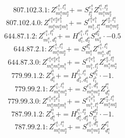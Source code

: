 \documentclass[letterpaper,10pt,fleqn,leqno,onecolumn]{article}
\begin{document}
\begin{equation} \;\;\;\;\;\;  807.102.3.1: Z^{e_{1}^{a},l_{1}^{a}}_{m_{1}^{a}m_{2}^{a}}+=S^{e_{1}^{a}}_{l_{2}^{a}}Z^{l_{1}^{a},l_{2}^{a}}_{m_{1}^{a}m_{2}^{a}} \end{equation}
\begin{equation} \;\;\;\;\;\;  807.102.4.0: Z^{e_{1}^{a}e_{2}^{a}e_{1}^{b}}_{m_{1}^{a}m_{2}^{a}m_{1}^{b}}+=S^{e_{1}^{a}e_{1}^{b}}_{m_{1}^{b},l_{1}^{a}}Z^{e_{2}^{a},l_{1}^{a}}_{m_{1}^{a}m_{2}^{a}} \end{equation}
\begin{equation} \;\;\;\;\;\;  644.87.1.2: Z^{e_{1}^{a},l_{1}^{a}}_{m_{1}^{a},d_{1}^{a}}+=H^{e_{1}^{a},l_{1}^{a}}_{d_{1}^{a},d_{2}^{a}}S^{d_{2}^{a}}_{m_{1}^{a}}\cdot -0.5 \end{equation}
\begin{equation} \;\;\;\;\;\;  644.87.2.1: Z^{e_{1}^{a},l_{1}^{a}}_{m_{1}^{a}m_{2}^{a}}+=S^{d_{1}^{a}}_{m_{1}^{a}}Z^{e_{1}^{a},l_{1}^{a}}_{m_{2}^{a},d_{1}^{a}} \end{equation}
\begin{equation} \;\;\;\;\;\;  644.87.3.0: Z^{e_{1}^{a}e_{2}^{a}e_{1}^{b}}_{m_{1}^{a}m_{2}^{a}m_{1}^{b}}+=S^{e_{1}^{a}e_{1}^{b}}_{m_{1}^{b},l_{1}^{a}}Z^{e_{2}^{a},l_{1}^{a}}_{m_{1}^{a}m_{2}^{a}} \end{equation}
\begin{equation} \;\;\;\;\;\;  779.99.1.2: Z^{l_{1}^{a}}_{d_{1}^{a}}+=H^{l_{1}^{b},l_{1}^{a}}_{d_{1}^{b},d_{1}^{a}}S^{d_{1}^{b}}_{l_{1}^{b}}\cdot -1. \end{equation}
\begin{equation} \;\;\;\;\;\;  779.99.2.1: Z^{e_{1}^{a},l_{1}^{a}}_{m_{1}^{a}m_{2}^{a}}+=S^{e_{1}^{a},d_{1}^{a}}_{m_{1}^{a}m_{2}^{a}}Z^{l_{1}^{a}}_{d_{1}^{a}} \end{equation}
\begin{equation} \;\;\;\;\;\;  779.99.3.0: Z^{e_{1}^{a}e_{2}^{a}e_{1}^{b}}_{m_{1}^{a}m_{2}^{a}m_{1}^{b}}+=S^{e_{1}^{a}e_{1}^{b}}_{m_{1}^{b},l_{1}^{a}}Z^{e_{2}^{a},l_{1}^{a}}_{m_{1}^{a}m_{2}^{a}} \end{equation}
\begin{equation} \;\;\;\;\;\;  787.99.1.2: Z^{l_{1}^{a}}_{d_{1}^{a}}+=H^{l_{1}^{a},l_{2}^{a}}_{d_{1}^{a},d_{2}^{a}}S^{d_{2}^{a}}_{l_{2}^{a}}\cdot -1. \end{equation}
\begin{equation} \;\;\;\;\;\;  787.99.2.1: Z^{e_{1}^{a},l_{1}^{a}}_{m_{1}^{a}m_{2}^{a}}+=S^{e_{1}^{a},d_{1}^{a}}_{m_{1}^{a}m_{2}^{a}}Z^{l_{1}^{a}}_{d_{1}^{a}} \end{equation}
\end{document}
